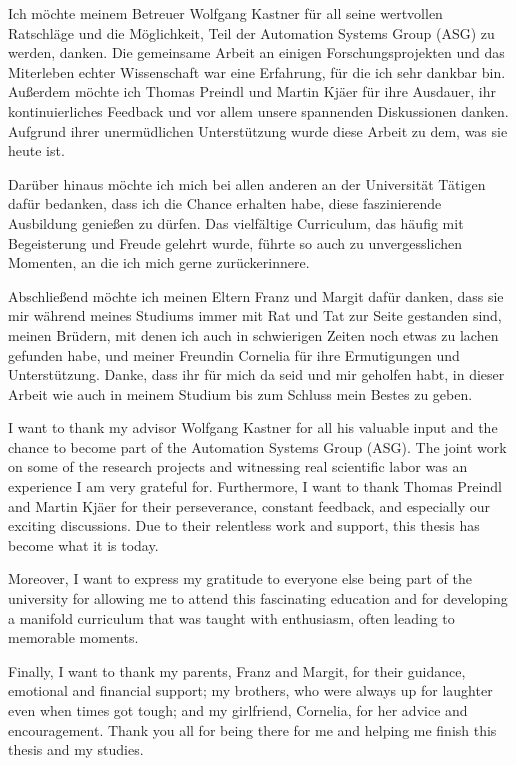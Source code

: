 \documentclass[draft,final]{vutinfth} %
\begin{document}
\frontmatter %

\addstatementpage

\begin{danksagung*}
Ich möchte meinem Betreuer Wolfgang Kastner für all seine wertvollen Ratschläge und die Möglichkeit, Teil der Automation Systems Group (ASG) zu werden, danken. Die gemeinsame Arbeit an einigen Forschungsprojekten und das Miterleben echter Wissenschaft war eine Erfahrung, für die ich sehr dankbar bin. Außerdem möchte ich Thomas Preindl und Martin Kjäer für ihre Ausdauer, ihr kontinuierliches Feedback und vor allem unsere spannenden Diskussionen danken. Aufgrund ihrer unermüdlichen Unterstützung wurde diese Arbeit zu dem, was sie heute ist.

Darüber hinaus möchte ich mich bei allen anderen an der Universität Tätigen dafür bedanken, dass ich die Chance erhalten habe, diese faszinierende Ausbildung genießen zu dürfen. Das vielfältige Curriculum, das häufig mit Begeisterung und Freude gelehrt wurde, führte so auch zu unvergesslichen Momenten, an die ich mich gerne zurückerinnere.

Abschließend möchte ich meinen Eltern Franz und Margit dafür danken, dass sie mir während meines Studiums immer mit Rat und Tat zur Seite gestanden sind, meinen Brüdern, mit denen ich auch in schwierigen Zeiten noch etwas zu lachen gefunden habe, und meiner Freundin Cornelia für ihre Ermutigungen und Unterstützung. Danke, dass ihr für mich da seid und mir geholfen habt, in dieser Arbeit wie auch in meinem Studium bis zum Schluss mein Bestes zu geben.
\end{danksagung*}

\begin{acknowledgements*}
I want to thank my advisor Wolfgang Kastner for all his valuable input and the chance to become part of the Automation Systems Group (ASG). The joint work on some of the research projects and witnessing real scientific labor was an experience I am very grateful for. Furthermore, I want to thank Thomas Preindl and Martin Kjäer for their perseverance, constant feedback, and especially our exciting discussions. Due to their relentless work and support, this thesis has become what it is today.

Moreover, I want to express my gratitude to everyone else being part of the university for allowing me to attend this fascinating education and for developing a manifold curriculum that was taught with enthusiasm, often leading to memorable moments.

Finally, I want to thank my parents, Franz and Margit, for their guidance, emotional and financial support; my brothers, who were always up for laughter even when times got tough; and my girlfriend, Cornelia, for her advice and encouragement. Thank you all for being there for me and helping me finish this thesis and my studies.
\end{acknowledgements*}
\end{document}
